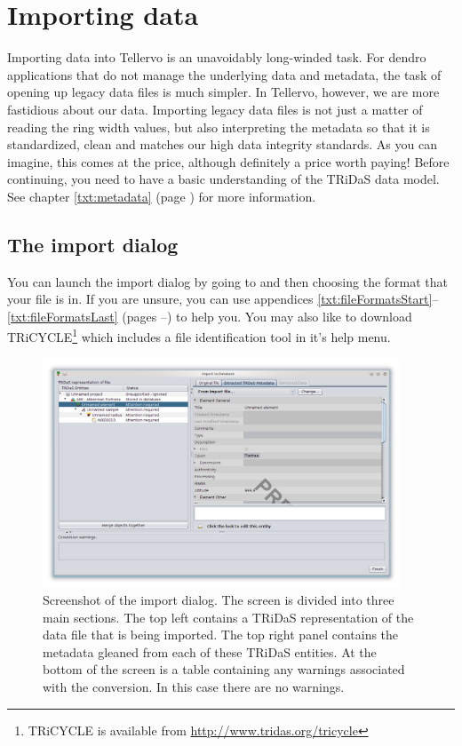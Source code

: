\section{Importing data}
Importing data into Tellervo is an unavoidably long-winded task.  For dendro applications that do not manage the underlying data and metadata, the task of opening up legacy data files is much simpler.  In Tellervo, however, we are more fastidious about our data.  Importing legacy data files is not just a matter of reading the ring width values, but also interpreting the metadata so that it is standardized, clean and matches our high data integrity standards.  As you can imagine, this comes at the price, although definitely a price worth paying!  Before continuing, you need to have a basic understanding of the TRiDaS data model.  See chapter \ref{txt:metadata} (page \pageref{txt:metadata}) for more information.


\subsection{The import dialog}
You can launch the import dialog by going to  and then choosing the format that your file is in.  If you are unsure, you can use appendices \ref{txt:fileFormatsStart}--\ref{txt:fileFormatsLast} (pages \pageref{txt:fileFormatsStart}--\pageref{txt:fileFormatsEnd}) to help you.  You may also like to download TRiCYCLE\footnote{TRiCYCLE is available from \url{http://www.tridas.org/tricycle}} which includes a file identification tool in it's help menu.

\begin{figure}[htbp]
  \centering
    \includegraphics[width=0.95\textwidth]{Images/importdata1.png}
    \caption{Screenshot of the import dialog.  The screen is divided into three main sections.  The top left contains a TRiDaS representation of the data file that is being imported.  The top right panel contains the metadata gleaned from each of these TRiDaS entities.  At the bottom of the screen is a table containing any warnings associated with the conversion.  In this case there are no warnings. }
    \label{fig:import}
\end{figure}

